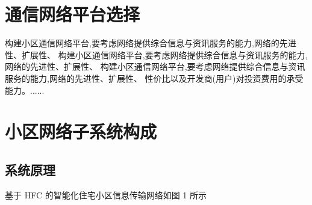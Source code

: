 
\chapter{通信网络平台选择}
构建小区通信网络平台,要考虑网络提供综合信息与资讯服务的能力,网络的先进性、扩展性、
构建小区通信网络平台,要考虑网络提供综合信息与资讯服务的能力,网络的先进性、扩展性、
构建小区通信网络平台,要考虑网络提供综合信息与资讯服务的能力,网络的先进性、扩展性、
性价比以及开发商(用户)对投资费用的承受能力。......\par


\chapter{小区网络子系统构成}
\section{系统原理}
基于 HFC 的智能化住宅小区信息传输网络如图 1 所示\par

